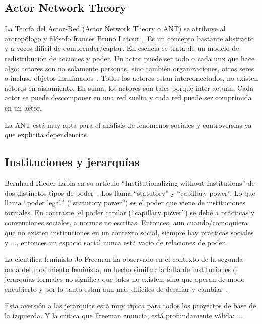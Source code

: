 \subsection{Actor Network Theory}

La Teoría del Actor-Red (Actor Network Theory o ANT) se atribuye al antropólogo y filósofo francés Bruno Latour~\autocite{Latour2010}.
Es un concepto bastante abstracto y a veces difícil de comprender/captar.
En esencia se trata de un modelo de redistribución de acciones y poder.
Un actor puede ser todo o cada unx que hace algo: actores son no solamente personas, sino también organizaciones, otros seres o incluso objetos inanimados~\autocite{Venturini2010b}.
Todos los actores estan interconectados, no existen actores en aislamiento.
En suma, los actores son tales porque inter-actuan.
Cada actor se puede descomponer en una red suelta y cada red puede ser comprimida en un actor.

La ANT está muy apta para el análisis de fenómenos sociales y controversias ya que explicita dependencias.


\subsection{Instituciones y jerarquías}

Bernhard Rieder habla en su artículo ``Institutionalizing without Institutions'' de dos distinctos tipos de poder~\autocite{Rieder2012}.
Los llama ``statutory'' y ``capillary power''.
Lo que llama ``poder legal'' (``statutory power'') es el poder que viene de instituciones formales.
En contraste, el poder capilar (``capillary power'') se debe a prácticas y convenciones sociales, a normas no escritas.
Entonces, aun cuando/comoquiera que no existen instituciones en un contexto social, siempre hay prácticas sociales y ..., entonces un espacio social nunca está vacio de relaciones de poder.

La científica feminista Jo Freeman ha observado en el contexto de la segunda onda del movimiento feminista, un hecho similar:
la falta de instituciones o jerarquías formales no significa que tales no existen, sino que operan de modo encubierto y por lo tanto estan aun más difíciles de desafíar y cambiar~\autocite{Freeman1970}.

Esta aversión a las jerarquías está muy típica para todos los proyectos de base de la izquierda.
Y la crítica que Freeman enuncia, está profundamente válida: ...


